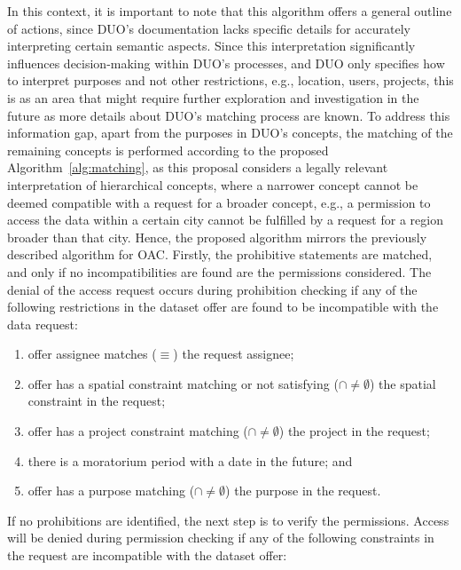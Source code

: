 In this context, it is important to note that this algorithm offers a general outline of actions, since DUO's documentation lacks specific details for accurately interpreting certain semantic aspects.
Since this interpretation significantly influences decision-making within DUO's processes, and DUO only specifies how to interpret purposes and not other restrictions, e.g., location, users, projects, this is as an area that might require further exploration and investigation in the future as more details about DUO's matching process are known.
To address this information gap, apart from the purposes in DUO's concepts, the matching of the remaining concepts is performed according to the proposed Algorithm~\ref{alg:matching}, as this proposal considers a legally relevant interpretation of hierarchical concepts, where a narrower concept cannot be deemed compatible with a request for a broader concept, e.g., a permission to access the data within a certain city cannot be fulfilled by a request for a region broader than that city.
Hence, the proposed algorithm mirrors the previously described algorithm for OAC.
Firstly, the prohibitive statements are matched, and only if no incompatibilities are found are the permissions considered.
The denial of the access request occurs during prohibition checking if any of the following restrictions in the dataset offer are found to be incompatible with the data request:

\begin{enumerate}
    \item offer assignee matches ($\equiv$) the request assignee; 
    \item offer has a spatial constraint matching or not satisfying ($\cap\neq\emptyset$) the spatial constraint in the request;
    \item offer has a project constraint matching ($\cap\neq\emptyset$) the project in the request;
    \item there is a moratorium period with a date in the future; and 
    \item offer has a purpose matching ($\cap\neq\emptyset$) the purpose in the request.
\end{enumerate}

If no prohibitions are identified, the next step is to verify the permissions.
Access will be denied during permission checking if any of the following constraints in the request are incompatible with the dataset offer:

